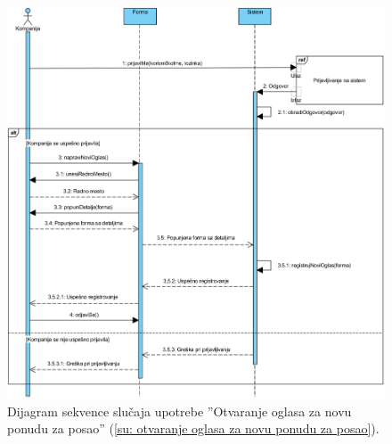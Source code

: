 \begin{figure}[H]
	\centering
	\includegraphics[width=\textwidth]{dijagrami/dijagrami-sekvence/otvaranje-oglasa-za-novu-ponudu-za-posao.png}
	\caption{Dijagram sekvence slu\v caja upotrebe ''Otvaranje oglasa za novu ponudu za posao'' (\ref{su: otvaranje oglasa za novu ponudu za posao}).}
\end{figure}